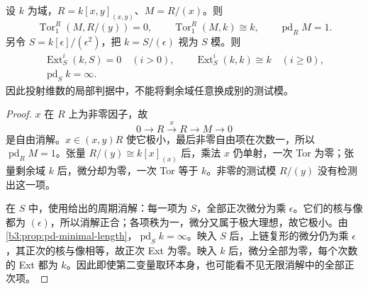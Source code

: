 \begin{proposition}\label{b3:prop:pd-test-module-counterexamples}
	设 \(k\) 为域，\(R=k[x,y]_{(x,y)}\)、\(M=R/(x)\)。则
	\[
		\operatorname{Tor}_1^R(M,R/(y))=0,\qquad \operatorname{Tor}_1^R(M,k)\cong k,\qquad \operatorname{pd}_RM=1.
	\]
	另令 \(S=k[\epsilon]/(\epsilon^2)\)，把 \(k=S/(\epsilon)\) 视为 \(S\) 模。则
	\[
		\begin{gathered}
			\operatorname{Ext}_S^i(k,S)=0\quad(i>0),\qquad \operatorname{Ext}_S^i(k,k)\cong k\quad(i\ge0),\\
			\operatorname{pd}_Sk=\infty.
		\end{gathered}
	\]
	因此投射维数的局部判据中，不能将剩余域任意换成别的测试模。
\end{proposition}
\begin{proof}
	\(x\) 在 \(R\) 上为非零因子，故
	\[
		0\longrightarrow R\xrightarrow{x}R\longrightarrow M\longrightarrow0
	\]
	是自由消解。\(x\in(x,y)R\) 使它极小，最后非零自由项在次数一，所以 \(\operatorname{pd}_RM=1\)。张量 \(R/(y)\cong k[x]_{(x)}\) 后，乘法 \(x\) 仍单射，一次 Tor 为零；张量剩余域 \(k\) 后，微分却为零，一次 Tor 等于 \(k\)。非零的测试模 \(R/(y)\) 没有检测出这一项。

	在 \(S\) 中，使用给出的周期消解：每一项为 \(S\)，全部正次微分为乘 \(\epsilon\)。它们的核与像都为 \((\epsilon)\)，所以消解正合；各项秩为一，微分又属于极大理想，故它极小。由\cref{b3:prop:pd-minimal-length}，\(\operatorname{pd}_Sk=\infty\)。映入 \(S\) 后，上链复形的微分仍为乘 \(\epsilon\)，其正次的核与像相等，故正次 Ext 为零。映入 \(k\) 后，微分全部为零，每个次数的 Ext 都为 \(k\)。因此即使第二变量取环本身，也可能看不见无限消解中的全部正次项。
\end{proof}

